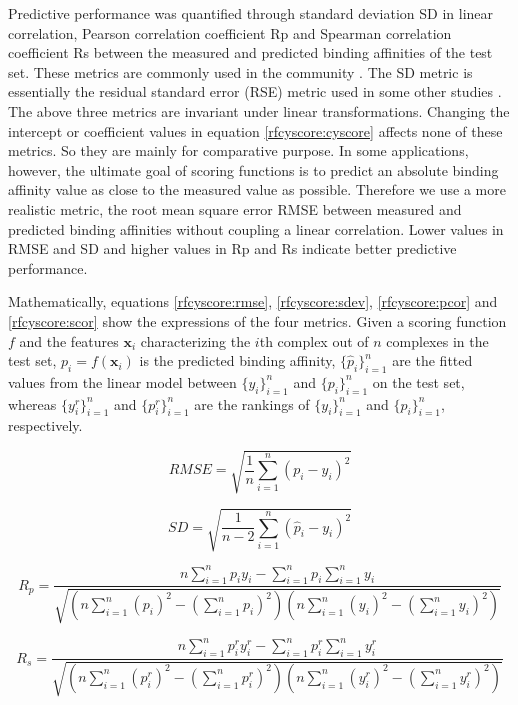Predictive performance was quantified through standard deviation SD in linear correlation, Pearson correlation coefficient Rp and Spearman correlation coefficient Rs between the measured and predicted binding affinities of the test set. These metrics are commonly used in the community \citep{1313}. The SD metric is essentially the residual standard error (RSE) metric used in some other studies \citep{963}. The above three metrics are invariant under linear transformations. Changing the intercept or coefficient values in equation \eqref{rfcyscore:cyscore} affects none of these metrics. So they are mainly for comparative purpose. In some applications, however, the ultimate goal of scoring functions is to predict an absolute binding affinity value as close to the measured value as possible. Therefore we use a more realistic metric, the root mean square error RMSE between measured and predicted binding affinities without coupling a linear correlation. Lower values in RMSE and SD and higher values in Rp and Rs indicate better predictive performance.

Mathematically, equations \eqref{rfcyscore:rmse}, \eqref{rfcyscore:sdev}, \eqref{rfcyscore:pcor} and \eqref{rfcyscore:scor} show the expressions of the four metrics. Given a scoring function $f$ and the features $\mathbf{x}_i$ characterizing the $i$th complex out of $n$ complexes in the test set, $p_i=f(\mathbf{x}_i)$ is the predicted binding affinity, $\{\hat{p}_i\}_{i=1}^n$ are the fitted values from the linear model between $\{y_i\}_{i=1}^n$ and $\{p_i\}_{i=1}^n$ on the test set, whereas $\{y^r_i\}_{i=1}^n$ and $\{p^r_i\}_{i=1}^n$ are the rankings of $\{y_i\}_{i=1}^n$ and $\{p_i\}_{i=1}^n$, respectively.

\begin{equation}
RMSE=\sqrt{\frac{1}{n}\sum_{i=1}^n(p_i-y_i)^2}
\label{rfcyscore:rmse}
\end{equation}

\begin{equation}
SD=\sqrt{\frac{1}{n-2}\sum_{i=1}^n(\hat{p}_i-y_i)^2}
\label{rfcyscore:sdev}
\end{equation}

\begin{equation}
R_p=\frac{n\sum_{i=1}^np_iy_i-\sum_{i=1}^np_i\sum_{i=1}^ny_i}{\sqrt{(n\sum_{i=1}^n(p_i)^2-(\sum_{i=1}^np_i)^2)(n\sum_{i=1}^n(y_i)^2-(\sum_{i=1}^ny_i)^2)}}
\label{rfcyscore:pcor}
\end{equation}

\begin{equation}
R_s=\frac{n\sum_{i=1}^np^r_iy^r_i-\sum_{i=1}^np^r_i\sum_{i=1}^ny^r_i}{\sqrt{(n\sum_{i=1}^n(p^r_i)^2-(\sum_{i=1}^np^r_i)^2)(n\sum_{i=1}^n(y^r_i)^2-(\sum_{i=1}^ny^r_i)^2)}}
\label{rfcyscore:scor}
\end{equation}

